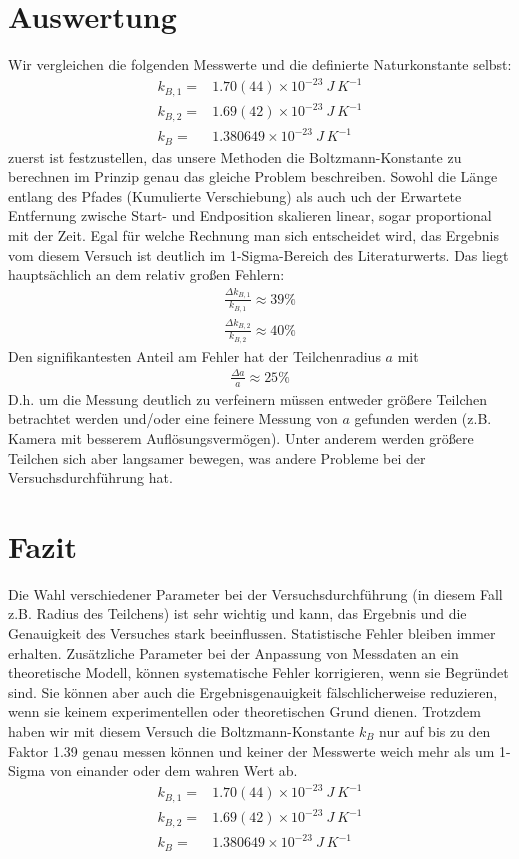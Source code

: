 \documentclass[a4paper,10pt]{article}
\begin{document}
\section{Auswertung}
Wir vergleichen die folgenden Messwerte und die definierte Naturkonstante selbst:
\begin{align*}
 k_{B,1} = &1.70(44)\times10^{-23}\:J\:K^{-1}\\
 k_{B,2} = &1.69(42)\times10^{-23}\:J\:K^{-1}\\
 k_B = &1.380649\times 10^{-23}\:J\:K^{-1}
\end{align*}
zuerst ist festzustellen, das unsere Methoden die Boltzmann-Konstante zu berechnen im Prinzip genau das gleiche Problem beschreiben. Sowohl die Länge entlang des Pfades (Kumulierte Verschiebung) als auch uch der Erwartete Entfernung zwische Start- und Endposition skalieren linear, sogar proportional mit der Zeit.
Egal für welche Rechnung man sich entscheidet wird, das Ergebnis vom diesem Versuch ist deutlich im 1-Sigma-Bereich des Literaturwerts. Das liegt hauptsächlich an dem relativ großen Fehlern:
\begin{align*}
 \frac{\Delta k_{B,1}}{k_{B,1}}\approx 39\% 
\end{align*}
\begin{align*}
 \frac{\Delta k_{B,2}}{k_{B,2}}\approx 40\% 
\end{align*}
Den signifikantesten Anteil am Fehler hat der Teilchenradius \(a\) mit
\begin{align*}
 \frac{\Delta a}{a}\approx 25\%
\end{align*}
D.h. um die Messung deutlich zu verfeinern müssen entweder größere Teilchen betrachtet werden und/oder eine feinere Messung von \(a\) gefunden werden (z.B. Kamera mit besserem Auflösungsvermögen). Unter anderem werden größere Teilchen sich aber langsamer bewegen, was andere Probleme bei der Versuchsdurchführung hat.

\section{Fazit}
Die Wahl verschiedener Parameter bei der Versuchsdurchführung (in diesem Fall z.B. Radius des Teilchens) ist sehr wichtig und kann, das Ergebnis und die Genauigkeit des Versuches stark beeinflussen. Statistische Fehler bleiben immer erhalten. Zusätzliche Parameter bei der Anpassung von Messdaten an ein theoretische Modell, können systematische Fehler korrigieren, wenn sie Begründet sind. Sie können aber auch die Ergebnisgenauigkeit fälschlicherweise reduzieren, wenn sie keinem experimentellen oder theoretischen Grund dienen.
Trotzdem haben wir mit diesem Versuch die Boltzmann-Konstante \(k_B\)  nur auf bis zu den Faktor 1.39 genau messen können und keiner der Messwerte weich mehr als um 1-Sigma von einander oder dem wahren Wert ab.
 \begin{align*}
 k_{B,1} = &1.70(44)\times10^{-23}\:J\:K^{-1}\\
 k_{B,2} = &1.69(42)\times10^{-23}\:J\:K^{-1}\\
 k_B = &1.380649\times 10^{-23}\:J\:K^{-1}
\end{align*}


\unboldmath
\end{document}
